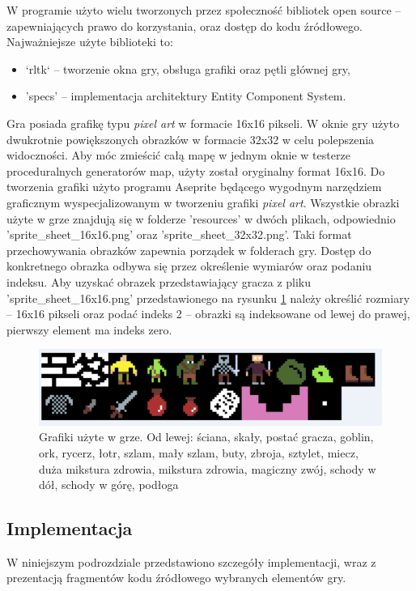 \documentclass[12pt,twoside]{article}
\begin{document}
W programie użyto wielu tworzonych przez społeczność bibliotek open source -- zapewniających prawo do korzystania, oraz dostęp do kodu źródłowego. Najważniejsze użyte biblioteki to:
\begin{itemize}
	\item `rltk` -- tworzenie okna gry, obsługa grafiki oraz pętli głównej gry,
	\item 'specs' -- implementacja architektury Entity Component System.
\end{itemize}

Gra posiada grafikę typu \emph{pixel art} w formacie 16x16 pikseli. W oknie gry użyto dwukrotnie powiększonych obrazków w formacie 32x32 w celu polepszenia widoczności. Aby móc zmieścić całą mapę w jednym oknie w testerze proceduralnych generatorów map, użyty został oryginalny format 16x16. Do tworzenia grafiki użyto programu Aseprite \cite{aseprite} będącego wygodnym narzędziem graficznym wyspecjalizowanym w tworzeniu grafiki \emph{pixel art}. Wszystkie obrazki użyte w grze znajdują się w folderze 'resources' w dwóch plikach, odpowiednio 'sprite\_sheet\_16x16.png' oraz 'sprite\_sheet\_32x32.png'. Taki format przechowywania obrazków zapewnia porządek w folderach gry. Dostęp do konkretnego obrazka odbywa się przez określenie wymiarów oraz podaniu indeksu. Aby uzyskać obrazek przedstawiający gracza z pliku 'sprite\_sheet\_16x16.png' przedstawionego na rysunku \ref{mygame:spritesheet} należy określić rozmiary -- 16x16 pikseli oraz podać indeks 2 -- obrazki są indeksowane od lewej do prawej, pierwszy element ma indeks zero.

\FloatBarrier
\begin{figure}[ht]
	\centering
	\includegraphics[width=16cm]{images/mygame/spritesheet.png}
	\caption{Grafiki użyte w grze. Od lewej: ściana, skały, postać gracza, goblin, ork, rycerz, łotr, szlam, mały szlam, buty, zbroja, sztylet, miecz, duża mikstura zdrowia, mikstura zdrowia, magiczny zwój, schody w dół, schody w górę, podłoga}
	\label{mygame:spritesheet}
\end{figure}
\FloatBarrier

\subsection{Implementacja}
W niniejszym podrozdziale przedstawiono szczegóły implementacji, wraz z prezentacją fragmentów kodu źródłowego wybranych elementów gry.
\end{document}
